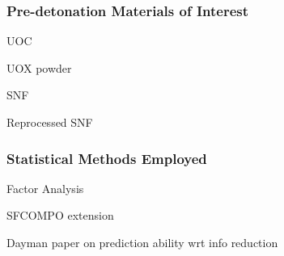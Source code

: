 
\begin{frame}
  \frametitle{Pre-detonation Materials of Interest}
  UOC

  UOX powder

  SNF

  Reprocessed SNF
\end{frame}

\begin{frame}
  \frametitle{Statistical Methods Employed}
  Factor Analysis

  SFCOMPO extension

  Dayman paper on prediction ability wrt info reduction
\end{frame}

